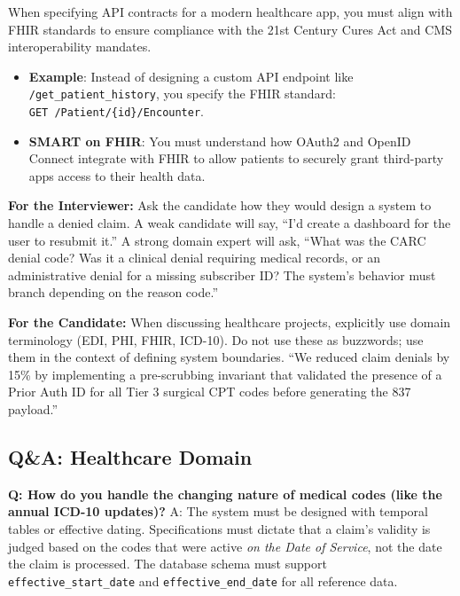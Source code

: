 \documentclass[
  11pt,
  openany,
  oneside]{book}
\providecommand{\tightlist}{%
  \setlength{\itemsep}{0pt}\setlength{\parskip}{0pt}}
\renewenvironment{quote}{\begin{customquote}}{\end{customquote}}
\begin{document}
When specifying API contracts for a modern healthcare app, you must
align with FHIR standards to ensure compliance with the 21st Century
Cures Act and CMS interoperability mandates.

\begin{itemize}
\tightlist
\item
  \textbf{Example}: Instead of designing a custom API endpoint like
  \texttt{/get\_patient\_history}, you specify the FHIR standard:
  \texttt{GET\ /Patient/\{id\}/Encounter}.
\item
  \textbf{SMART on FHIR}: You must understand how OAuth2 and OpenID
  Connect integrate with FHIR to allow patients to securely grant
  third-party apps access to their health data.
\end{itemize}

\begin{quote}
\textbf{For the Interviewer:} Ask the candidate how they would design a
system to handle a denied claim. A weak candidate will say, ``I'd create
a dashboard for the user to resubmit it.'' A strong domain expert will
ask, ``What was the CARC denial code? Was it a clinical denial requiring
medical records, or an administrative denial for a missing subscriber
ID? The system's behavior must branch depending on the reason code.''
\end{quote}

\begin{quote}
\textbf{For the Candidate:} When discussing healthcare projects,
explicitly use domain terminology (EDI, PHI, FHIR, ICD-10). Do not use
these as buzzwords; use them in the context of defining system
boundaries. ``We reduced claim denials by 15\% by implementing a
pre-scrubbing invariant that validated the presence of a Prior Auth ID
for all Tier 3 surgical CPT codes before generating the 837 payload.''
\end{quote}

\subsection{Q\&A: Healthcare Domain}\label{qa-healthcare-domain}

\textbf{Q: How do you handle the changing nature of medical codes (like
the annual ICD-10 updates)?} A: The system must be designed with
temporal tables or effective dating. Specifications must dictate that a
claim's validity is judged based on the codes that were active \emph{on
the Date of Service}, not the date the claim is processed. The database
schema must support \texttt{effective\_start\_date} and
\texttt{effective\_end\_date} for all reference data.
\end{document}
